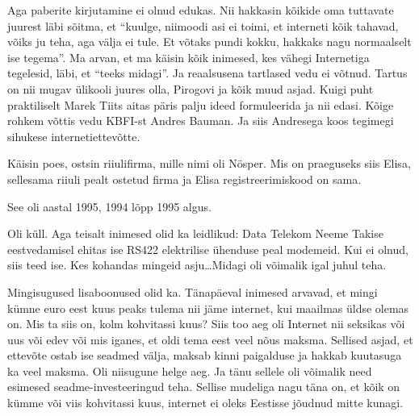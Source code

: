 Aga paberite kirjutamine ei olnud edukas. Nii hakkasin kõikide oma tuttavate 
juurest läbi sõitma, et \enquote{kuulge, niimoodi asi ei toimi, et interneti 
kõik tahavad, võiks ju teha, aga välja ei tule. Et  võtaks pundi kokku, hakkaks 
nagu normaalselt ise tegema}. Ma arvan, et ma käisin kõik inimesed, kes vähegi 
Internetiga tegelesid, läbi, et \enquote{teeks midagi}. Ja reaalsusena 
tartlased vedu ei võtnud. Tartus on nii mugav ülikooli juures olla,  Pirogovi 
ja kõik muud asjad. Kuigi puht praktiliselt Marek Tiits aitas päris palju ideed formuleerida ja nii edasi. Kõige rohkem võttis 
vedu KBFI-st Andres Bauman. Ja siis 
Andresega koos tegimegi sihukese internetiettevõtte. 

Käisin poes, ostsin riiulifirma, mille nimi oli 
Nösper. Mis  on praeguseks siis Elisa, sellesama  
riiuli pealt ostetud firma ja Elisa registreerimiskood on sama. 


See oli aastal 1995, 1994 lõpp 1995 algus.


Oli küll. Aga teisalt inimesed olid ka leidlikud: Data Telekom Neeme Takise eestvedamisel ehitas ise RS422 
elektrilise ühenduse peal modemeid. Kui ei olnud, siis teed ise. Kes kohandas 
mingeid asju\ldots Midagi oli võimalik igal juhul teha.


Mingisugused lisaboonused olid ka. Tänapäeval inimesed arvavad, et mingi kümne 
euro eest kuus peaks tulema nii jäme internet, kui maailmas üldse olemas on. 
Mis ta siis on, kolm kohvitassi kuus? Siis too aeg oli Internet nii  seksikas 
või uus või edev või mis iganes, et oldi tema eest veel nõus maksma. Sellised 
asjad, et ettevõte ostab ise seadmed välja, maksab kinni paigalduse ja hakkab 
kuutasuga ka veel maksma. Oli niisugune helge aeg. Ja  tänu sellele oli 
võimalik need esimesed seadme-investeeringud teha. Sellise mudeliga nagu täna 
on, et kõik on kümme või viis kohvitassi kuus, internet ei oleks Eestisse 
jõudnud mitte kunagi.


